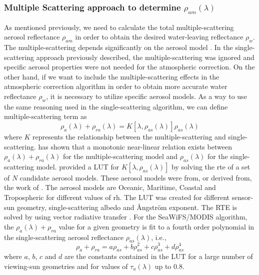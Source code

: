 \subsubsection{Multiple Scattering approach to determine $\rho_{am}(\lambda)$}
As mentioned  previously, we need to calculate the total multiple-scattering aerosol reflectance $\rho_{am}$ in order to obtain the desired water-leaving reflectance $\rho_w$. The multiple-scattering depends significantly on the aerosol model \cite{Gordon:1997}. In the single-scattering approach previously described, the multiple-scattering was ignored and specific aerosol properties were not needed for the atmospheric correction. On the other hand, if we want to include the multiple-scattering effects in the atmospheric correction algorithm in order to obtain more accurate water reflectance $\rho_w$, it is necessary to utilize specific aerosol models. As a way to use the same reasoning used in the single-scattering algorithm, we can define multiple-scattering term as
\begin{equation}\label{eq:multscat}
  \rho_a(\lambda) + \rho_{ra}(\lambda) = K[\lambda,\rho_{as}(\lambda)]\rho_{as}(\lambda)
\end{equation}
where $K$ represents the relationship between the multiple-scattering and single-scattering. \cite{Wang:1991} has shown that a monotonic near-linear relation exists between $\rho_a(\lambda)+\rho_{ra}(\lambda)$ for the multiple-scattering model and $\rho_{as}(\lambda)$ for the single-scattering model. \cite{Gordon:1994} provided a LUT for $K[\lambda,\rho_{as}(\lambda)]$ by solving the \gls{rte} of a set of $N$ candidate aerosol models. These aerosol models were from, or derived from, the work of \cite{Shettle:1979}. The aerosol models are Oceanic, Maritime, Coastal and Tropospheric for different values of \gls{rh}. The LUT was created for different sensor-sun geometry, single-scattering albedo and \AA ngstr\"{o}m exponent. The RTE is solved by using vector radiative transfer \cite{IOCCG:2010}. For the SeaWiFS/MODIS algorithm, the $\rho_a(\lambda)+\rho_{ra}$ value for a given geometry is fit to a fourth order polynomial in the single-scattering aerosol reflectance $\rho_{as}(\lambda)$, i.e.,
\begin{equation}\label{eq:polynomial}
  \rho_a+\rho_{ra} = a\rho_{as}+b\rho_{as}^2+c\rho_{as}^3+d\rho_{as}^4
\end{equation}
where $a$, $b$, $c$ and $d$ are the constants contained in the LUT for a large number of viewing-sun geometries and for values of $\tau_a(\lambda)$ up to $0.8$.

